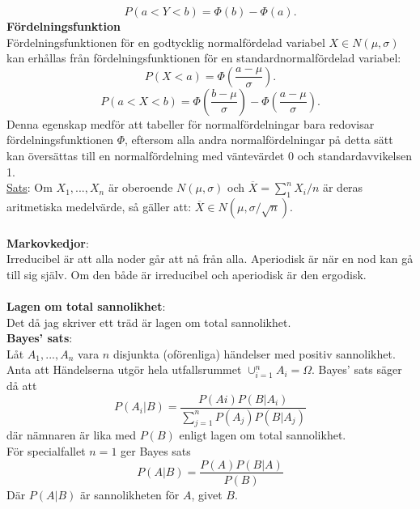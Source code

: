 \documentclass[8pt]{extarticle}
\begin{document}
\begin{multicols*}{2}
\begin{equation*}
P(a < Y < b) = \Phi (b) - \Phi (a).
\end{equation*}
\textbf{Fördelningsfunktion}\\
Fördelningsfunktionen för en godtycklig normalfördelad variabel $X \in N(\mu , \sigma)$  kan erhållas från fördelningsfunktionen för en standardnormalfördelad variabel:
\begin{equation*}
P(X < a) = \Phi \left(\frac{a - \mu}{\sigma}\right).
\end{equation*}
\begin{equation*}
P(a < X < b) = \Phi \left(\frac{b - \mu}{\sigma}\right) - \Phi \left(\frac{a - \mu}{\sigma}\right).
\end{equation*}
Denna egenskap medför att tabeller för normalfördelningar bara redovisar fördelningsfunktionen $\Phi$, eftersom alla andra normalfördelningar på detta sätt kan översättas till en normalfördelning med väntevärdet 0 och standardavvikelsen 1.\\
\underline{Sats}: Om $X_1, ... , X_n$ är oberoende $N(\mu,\sigma)$ och $\overline{X} = \sum_1^nX_i / n$ är deras aritmetiska medelvärde, så gäller att: $\overline{X} \in N(\mu, \sigma/\sqrt{n})$.\\
\\
\textbf{Markovkedjor}:\\
Irreducibel är att alla noder går att nå från alla. Aperiodisk är när en nod kan gå till sig själv. Om den både är irreducibel och aperiodisk är den ergodisk.\\
\\
\textbf{Lagen om total sannolikhet}:\\
Det då jag skriver ett träd är lagen om total sannolikhet.\\
\textbf{Bayes' sats}:\\
Låt $A_1, ... , A_n$ vara $n$ disjunkta (oförenliga) händelser med positiv sannolikhet. Anta att Händelserna utgör hela utfallsrummet $\cup_{i=1}^n A_i = \Omega$. Bayes' sats säger då att 
\begin{equation*}
P(A_i|B) = \frac{P(Ai)P(B|A_i)}{\sum_{j=1}^nP(A_j)P(B|A_j)}
\end{equation*}
där nämnaren är lika med $P(B)$ enligt lagen om total sannolikhet.\\
För specialfallet $n=1$ ger Bayes sats
\begin{equation*}
P(A|B)=\frac{P(A)P(B|A)}{P(B)}
\end{equation*}
Där $P(A|B)$ är sannolikheten för $A$, givet $B$.\\
\\

\end{multicols*}
\end{document}
